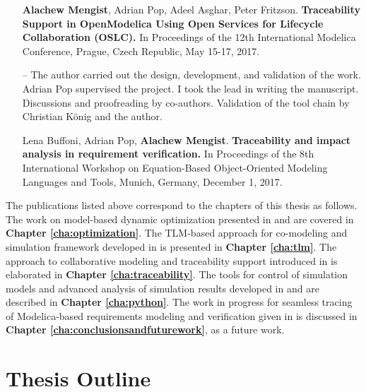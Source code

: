 \begin{itemize}
\item[\begin{NoHyper} \cite{alachewtraceability} \end{NoHyper}] \textbf{Alachew Mengist}, Adrian Pop, Adeel Asghar, Peter Fritzson. \textbf{Traceability Support in OpenModelica Using Open Services for Lifecycle Collaboration (OSLC).} In Proceedings of the 12th International Modelica Conference, Prague, Czech Republic, May 15-17, 2017. 


\item[--]The author carried out the design, development, and validation of the work. Adrian Pop supervised the project. I took the lead in writing the manuscript. Discussions and proofreading by co-authors. Validation of the tool chain by Christian König and the author.


\item[\begin{NoHyper} \cite{alachewrequirementstraceability} \end{NoHyper}] Lena Buffoni, Adrian Pop, \textbf{Alachew Mengist}. \textbf{Traceability and impact analysis in requirement verification.} In Proceedings of the 8th International Workshop on Equation-Based Object-Oriented Modeling Languages and Tools, Munich, Germany, December 1, 2017. 

\end{itemize}

The publications listed above correspond to the chapters of this thesis as follows. The work on model-based dynamic optimization presented in \cite{alachewoptimization} and \cite{alachewoptimizationdemo} are covered in \textbf{Chapter \ref{cha:optimization}}. The TLM-based approach for co-modeling and simulation framework developed in \cite{alachewtlm} is presented in \textbf{Chapter \ref{cha:tlm}}. The approach to collaborative modeling and traceability support introduced in \cite{alachewtraceability} is elaborated in \textbf{Chapter \ref{cha:traceability}}. The tools for control of simulation models and advanced analysis of simulation results developed in \cite{alachewompython} and \cite{alachewpysimulator} are described in \textbf{Chapter \ref{cha:python}}. The work in progress for seamless tracing of Modelica-based requirements modeling and verification given in \cite{alachewrequirementstraceability} is discussed in \textbf{Chapter \ref{cha:conclusionsandfuturework}}, as a future work.


\section{Thesis Outline}
\label{sec:Thesis Outline}

